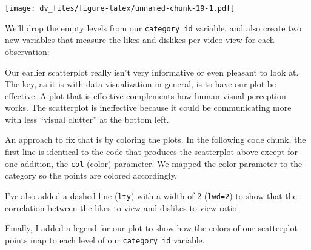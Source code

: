 \documentclass[]{article}
\newenvironment{Shaded}{\begin{snugshade}}{\end{snugshade}}
\newcommand{\KeywordTok}[1]{\textcolor[rgb]{0.13,0.29,0.53}{\textbf{#1}}}
\newcommand{\NormalTok}[1]{#1}
\newcommand{\OperatorTok}[1]{\textcolor[rgb]{0.81,0.36,0.00}{\textbf{#1}}}
\newcommand{\StringTok}[1]{\textcolor[rgb]{0.31,0.60,0.02}{#1}}
\begin{document}
\begin{Shaded}
\end{Shaded}

\texttt{[image: dv\_files/figure-latex/unnamed-chunk-19-1.pdf]}

We'll drop the empty levels from our \texttt{category\_id} variable, and
also create two new variables that measure the likes and dislikes per
video view for each observation:

\begin{Shaded}
\end{Shaded}

Our earlier scatterplot really isn't very informative or even pleasant
to look at. The key, as it is with data visualization in general, is to
have our plot be effective. A plot that is effective complements how
human visual perception works. The scatterplot is ineffective because it
could be communicating more with less ``visual clutter'' at the bottom
left.

An approach to fix that is by coloring the plots. In the following code
chunk, the first line is identical to the code that produces the
scatterplot above except for one addition, the \texttt{col} (color)
parameter. We mapped the color parameter to the category so the points
are colored accordingly.

I've also added a dashed line (\texttt{lty}) with a width of 2
(\texttt{lwd=2}) to show that the correlation between the likes-to-view
and dislikes-to-view ratio.

Finally, I added a legend for our plot to show how the colors of our
scatterplot points map to each level of our \texttt{category\_id}
variable.
\end{document}
